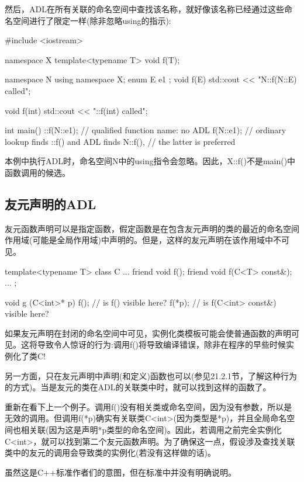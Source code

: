 然后，ADL在所有关联的命名空间中查找该名称，就好像该名称已经通过这些命名空间进行了限定一样(除非忽略using的指示):

\begin{cpp}
#include <iostream>

namespace X {
	template<typename T> void f(T);
}

namespace N {
	using namespace X;
	enum E { e1 };
	void f(E) {
		std::cout << "N::f(N::E) called\n";
	}
}

void f(int)
{
	std::cout << "::f(int) called\n";
}

int main()
{
	::f(N::e1); // qualified function name: no ADL
	f(N::e1); // ordinary lookup finds ::f() and ADL finds N::f(),
} // the latter is preferred
\end{cpp}

本例中执行ADL时，命名空间N中的using指令会忽略。因此，X::f()不是main()中函数调用的候选。

\subsection{友元声明的ADL}

友元函数声明可以是指定函数，假定函数是在包含友元声明的类的最近的命名空间作用域(可能是全局作用域)中声明的。但是，这样的友元声明在该作用域中不可见。

\begin{cpp}
template<typename T>
class C {
	...
	friend void f();
	friend void f(C<T> const&);
	...
};

void g (C<int>* p)
{
	f(); // is f() visible here?
	f(*p); // is f(C<int> const&) visible here?
}
\end{cpp}

如果友元声明在封闭的命名空间中可见，实例化类模板可能会使普通函数的声明可见。这将导致令人惊讶的行为:调用f()将导致编译错误，除非在程序的早些时候实例化了类C!

另一方面，只在友元声明中声明(和定义)函数也可以(参见21.2.1节，了解这种行为的方式)。当是友元的类在ADL的关联类中时，就可以找到这样的函数了。

重新在看下上一个例子。调用f()没有相关类或命名空间，因为没有参数，所以是无效的调用。但调用f(*p)确实有关联类C<int>(因为类型是*p)，并且全局命名空间也相关联(因为这是声明*p类型的命名空间)。因此，若调用之前完全实例化C<int>，就可以找到第二个友元函数声明。为了确保这一点，假设涉及查找关联类中的友元的调用会导致类的实例化(若没有这样做的话)。

\begin{notice}
虽然这是C++标准作者们的意图，但在标准中并没有明确说明。
\end{notice}

